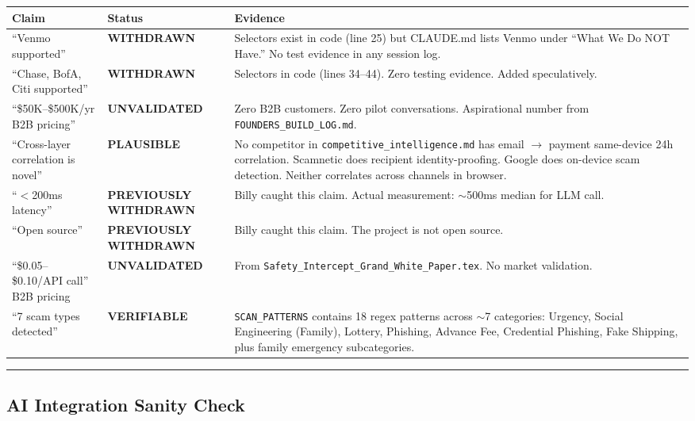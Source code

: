 \documentclass[11pt, letterpaper]{article}
\begin{document}
  \begin{longtable}{p{3.5cm} p{2.5cm} p{7cm}}
  \toprule
  \textbf{Claim} & \textbf{Status} & \textbf{Evidence} \\
  \midrule
  ``Venmo supported'' & \textcolor{withdrawn}{\textbf{WITHDRAWN}} & Selectors exist in code (line 25) but CLAUDE.md lists Venmo under ``What We Do NOT Have.'' No test evidence in any session log. \\
  \midrule
  ``Chase, BofA, Citi supported'' & \textcolor{withdrawn}{\textbf{WITHDRAWN}} & Selectors in code (lines 34--44). Zero testing evidence. Added speculatively. \\
  \midrule
  ``\$50K--\$500K/yr B2B pricing'' & \textcolor{unvalidated}{\textbf{UNVALIDATED}} & Zero B2B customers. Zero pilot conversations. Aspirational number from \texttt{FOUNDERS\_BUILD\_LOG.md}. \\
  \midrule
  ``Cross-layer correlation is novel'' & \textcolor{plausible}{\textbf{PLAUSIBLE}} & No competitor in \texttt{competitive\_intelligence.md} has email $\rightarrow$ payment same-device 24h correlation. Scamnetic does recipient identity-proofing. Google does on-device scam detection. Neither correlates across channels in browser. \\
  \midrule
  ``$<$200ms latency'' & \textcolor{withdrawn}{\textbf{PREVIOUSLY WITHDRAWN}} & Billy caught this claim. Actual measurement: $\sim$500ms median for LLM call. \\
  \midrule
  ``Open source'' & \textcolor{withdrawn}{\textbf{PREVIOUSLY WITHDRAWN}} & Billy caught this claim. The project is not open source. \\
  \midrule
  ``\$0.05--\$0.10/API call'' B2B pricing & \textcolor{unvalidated}{\textbf{UNVALIDATED}} & From \texttt{Safety\_Intercept\_Grand\_White\_Paper.tex}. No market validation. \\
  \midrule
  ``7 scam types detected'' & \textcolor{plausible}{\textbf{VERIFIABLE}} & \texttt{SCAN\_PATTERNS} contains 18 regex patterns across $\sim$7 categories: Urgency, Social Engineering (Family), Lottery, Phishing, Advance Fee, Credential Phishing, Fake Shipping, plus family emergency subcategories. \\
  \bottomrule
  \end{longtable}

  \vspace{12pt}
  \hrule
  \vspace{12pt}

  \subsection{AI Integration Sanity Check}
\end{document}

